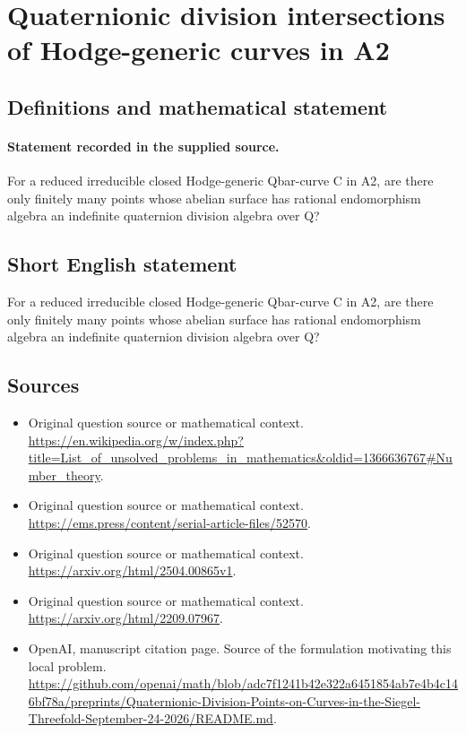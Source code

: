 \documentclass[11pt]{article}
\begin{document}
\section*{Quaternionic division intersections of Hodge-generic curves in A2}\label{30007253}
\subsection{Definitions and mathematical statement}
\paragraph{Statement recorded in the supplied source.}
For a reduced irreducible closed Hodge-generic Qbar-curve C in A2, are there only finitely many points whose abelian surface has rational endomorphism algebra an indefinite quaternion division algebra over Q?
\subsection{Short English statement}
For a reduced irreducible closed Hodge-generic Qbar-curve C in A2, are there only finitely many points whose abelian surface has rational endomorphism algebra an indefinite quaternion division algebra over Q?
\subsection{Sources}
\begin{itemize}
\item[S1] Original question source or mathematical context.
\url{https://en.wikipedia.org/w/index.php?title=List_of_unsolved_problems_in_mathematics&oldid=1366636767#Number_theory}.
\item[S2] Original question source or mathematical context.
\url{https://ems.press/content/serial-article-files/52570}.
\item[S3] Original question source or mathematical context.
\url{https://arxiv.org/html/2504.00865v1}.
\item[S4] Original question source or mathematical context.
\url{https://arxiv.org/html/2209.07967}.
\item[S5] OpenAI, manuscript citation page. Source of the formulation motivating this local problem.
\url{https://github.com/openai/math/blob/adc7f1241b42e322a6451854ab7e4b4c146bf78a/preprints/Quaternionic-Division-Points-on-Curves-in-the-Siegel-Threefold-September-24-2026/README.md}.
\end{itemize}
\end{document}
